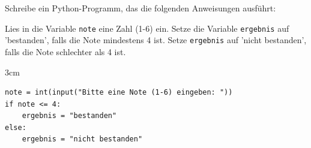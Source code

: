 \question[3]
Schreibe ein Python-Programm, das die folgenden Anweisungen ausführt:

Lies in die Variable \texttt{note} eine Zahl (1-6) ein.
Setze die Variable \texttt{ergebnis} auf 'bestanden', falls die Note mindestens 4 ist.
Setze \texttt{ergebnis} auf 'nicht bestanden', falls die Note schlechter als 4 ist.
\begin{solutionbox}{3cm}
\begin{lstlisting}
note = int(input("Bitte eine Note (1-6) eingeben: "))
if note <= 4:
    ergebnis = "bestanden"
else:
    ergebnis = "nicht bestanden"
\end{lstlisting}
\end{solutionbox}